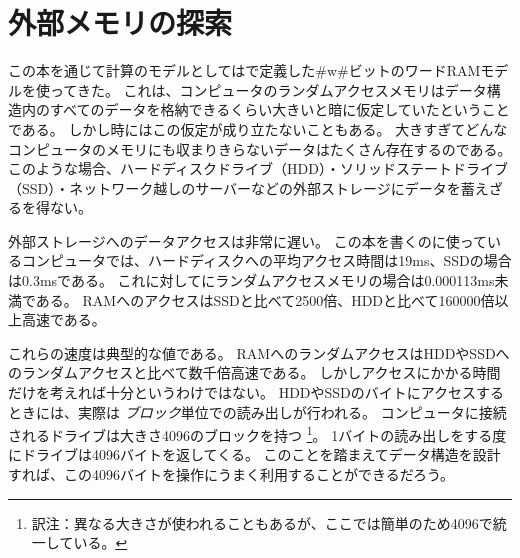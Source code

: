 \chapter{外部メモリの探索}
この本を通じて計算のモデルとしてはで定義した#w#ビットのワードRAMモデルを使ってきた。
これは、コンピュータのランダムアクセスメモリはデータ構造内のすべてのデータを格納できるくらい大きいと暗に仮定していたということである。
しかし時にはこの仮定が成り立たないこともある。
大きすぎてどんなコンピュータのメモリにも収まりきらないデータはたくさん存在するのである。
このような場合、ハードディスクドライブ（HDD）・ソリッドステートドライブ（SSD）・ネットワーク越しのサーバーなどの外部ストレージにデータを蓄えざるを得ない。

%
%
%
%
外部ストレージへのデータアクセスは非常に遅い。
この本を書くのに使っているコンピュータでは、ハードディスクへの平均アクセス時間は19ms、SSDの場合は0.3msである。
これに対してにランダムアクセスメモリの場合は0.000113ms未満である。
RAMへのアクセスはSSDと比べて2500倍、HDDと比べて160000倍以上高速である。

% 
% 

これらの速度は典型的な値である。
RAMへのランダムアクセスはHDDやSSDへのランダムアクセスと比べて数千倍高速である。
しかしアクセスにかかる時間だけを考えれば十分というわけではない。
HDDやSSDのバイトにアクセスするときには、実際は
\emph{ブロック}単位での読み出しが行われる。
%
コンピュータに接続されるドライブは大きさ4096のブロックを持つ
\footnote{訳注：異なる大きさが使われることもあるが、ここでは簡単のため4096で統一している。}。
1バイトの読み出しをする度にドライブは4096バイトを返してくる。
このことを踏まえてデータ構造を設計すれば、この4096バイトを操作にうまく利用することができるだろう。

